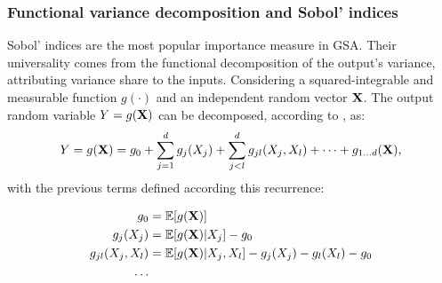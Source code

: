 \subsubsection{Functional variance decomposition and Sobol' indices}
Sobol' indices are the most popular importance measure in GSA. 
Their universality comes from the functional decomposition of the output's variance, attributing variance share to the inputs. 
Considering a squared-integrable and measurable function $g(\cdot)$ and an independent random vector ${\bf X}$. 
The output random variable $Y = g({\bf X})$ can be decomposed, according to \citet{hoeffiding_1948}, as: 
\begin{equation}
    Y = g({\bf X}) = g_0 + \sum_{j=1}^{d} g_j(X_j) + \sum_{j<l}^{d} g_{jl}(X_j, X_l) + \dots + g_{1 \dots d}({\bf X}),
    \label{eq:hoeffding}
\end{equation}
with the previous terms defined according this recurrence:  

\begin{subequations}
    \begin{align}
        g_0 &= \mathbb{E}[g({\bf X})]\\
        g_j(X_j) &= \mathbb{E}[g({\bf X}) | X_j] - g_0\\
        g_{jl}(X_j, X_l) &= \mathbb{E}[g({\bf X}) | X_j, X_l] - g_j(X_j) - g_l(X_l) - g_0\\
        \dots
    \end{align}
    \label{eq:hoeffding_terms}
\end{subequations}

